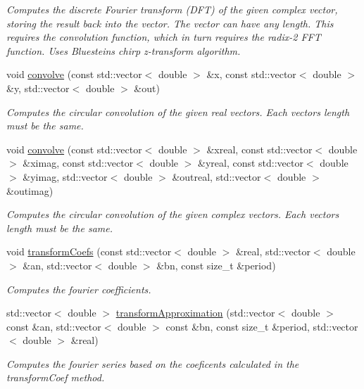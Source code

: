 \begin{DoxyCompactItemize}
\begin{DoxyCompactList}\small\item\em Computes the discrete Fourier transform (D\+FT) of the given complex vector, storing the result back into the vector. The vector can have any length. This requires the convolution function, which in turn requires the radix-\/2 F\+FT function. Uses Bluestein\textquotesingle{}s chirp z-\/transform algorithm. \end{DoxyCompactList}\item 
void \mbox{\hyperlink{class_f_f_treal_a8c7ae7505d1c80b4471a30585801d64b}{convolve}} (const std\+::vector$<$ double $>$ \&x, const std\+::vector$<$ double $>$ \&y, std\+::vector$<$ double $>$ \&out)
\begin{DoxyCompactList}\small\item\em Computes the circular convolution of the given real vectors. Each vector\textquotesingle{}s length must be the same. \end{DoxyCompactList}\item 
void \mbox{\hyperlink{class_f_f_treal_a375983c9725f461611341061dbdcc92f}{convolve}} (const std\+::vector$<$ double $>$ \&xreal, const std\+::vector$<$ double $>$ \&ximag, const std\+::vector$<$ double $>$ \&yreal, const std\+::vector$<$ double $>$ \&yimag, std\+::vector$<$ double $>$ \&outreal, std\+::vector$<$ double $>$ \&outimag)
\begin{DoxyCompactList}\small\item\em Computes the circular convolution of the given complex vectors. Each vector\textquotesingle{}s length must be the same. \end{DoxyCompactList}\item 
void \mbox{\hyperlink{class_f_f_treal_a15989e652f7e5f0e5045ee5d5232d065}{transform\+Coefs}} (const std\+::vector$<$ double $>$ \&real, std\+::vector$<$ double $>$ \&an, std\+::vector$<$ double $>$ \&bn, const size\+\_\+t \&period)
\begin{DoxyCompactList}\small\item\em Computes the fourier coefficients. \end{DoxyCompactList}\item 
std\+::vector$<$ double $>$ \mbox{\hyperlink{class_f_f_treal_ae276d75134969bd4a036f3e9e9136dec}{transform\+Approximation}} (std\+::vector$<$ double $>$ const \&an, std\+::vector$<$ double $>$ const \&bn, const size\+\_\+t \&period, std\+::vector$<$ double $>$ \&real)
\begin{DoxyCompactList}\small\item\em Computes the fourier series based on the coeficents calculated in the transform\+Coef method. \end{DoxyCompactList}\end{DoxyCompactItemize}


